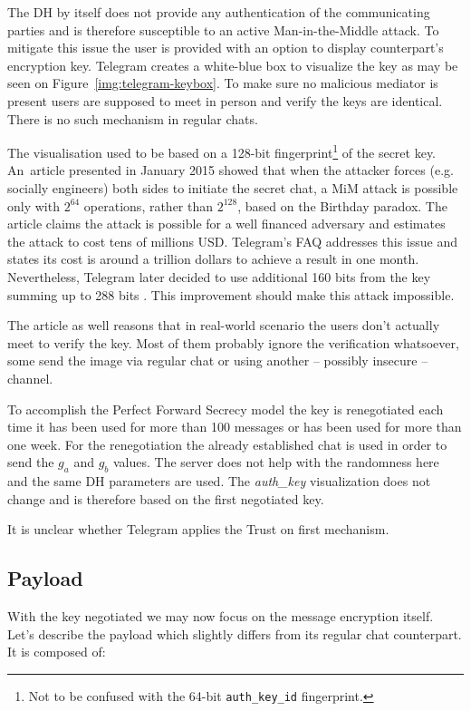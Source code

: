 \documentclass[thesis=M,english]{FITthesis}[2012/10/20]
\begin{document}
The DH by itself does not provide any authentication of the communicating parties and is therefore susceptible to an active Man-in-the-Middle attack. To mitigate this issue the user is provided with an option to display counterpart's encryption key. Telegram creates a white-blue box to visualize the key as may be seen on Figure~\ref{img:telegram-keybox}. To make sure no malicious mediator is present users are supposed to meet in person and verify the keys are identical. There is no such mechanism in regular chats.

The visualisation used to be based on a 128-bit fingerprint\footnote{Not to be confused with the 64-bit \texttt{auth\_key\_id} fingerprint.} of the secret key. An~article presented in January 2015 showed \cite{telegram-264} that when the attacker forces (e.g. socially engineers) both sides to initiate the secret chat, a MiM attack is possible only with $2^{64}$ operations, rather than $2^{128}$, based on the Birthday paradox. The article claims the attack is possible for a well financed adversary and estimates the attack to cost tens of millions USD. Telegram's FAQ addresses this issue and states its cost is around a trillion dollars to achieve a result in one month. Nevertheless, Telegram later decided to use additional 160 bits from the key summing up to 288 bits \cite{telegram-techfaq}. This improvement should make this attack impossible.

The article as well reasons that in real-world scenario the users don't actually meet to verify the key. Most of them probably ignore the verification whatsoever, some send the image via regular chat or using another -- possibly insecure -- channel.

To accomplish the Perfect Forward Secrecy model the key is renegotiated each time it has been used for more than 100 messages or has been used for more than one week. For the renegotiation the already established chat is used in order to send the $g_a$ and $g_b$ values. The server does not help with the randomness here and the same DH parameters are used. The \emph{auth\_key} visualization does not change and is therefore based on the first negotiated key.

It is unclear whether Telegram applies the Trust on first mechanism.


\subsection{Payload}

With the key negotiated we may now focus on the message encryption itself. Let's describe the payload which slightly differs from its regular chat counterpart. It is composed of:
\end{document}
